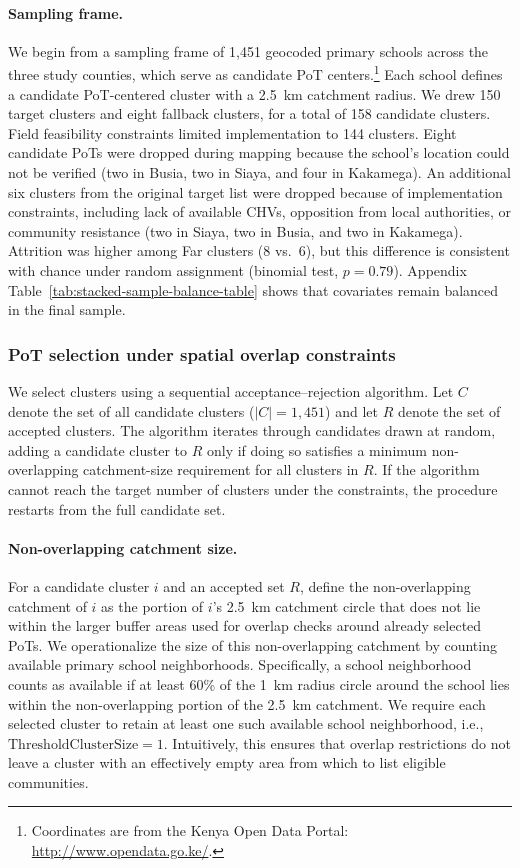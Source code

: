\documentclass[ECM\space ReStud.tex]{subfiles}
\begin{document}
\paragraph{Sampling frame.}
We begin from a sampling frame of 1{,}451 geocoded primary schools across the three study counties, which serve as candidate PoT centers.\footnote{Coordinates are from the Kenya Open Data Portal: \url{http://www.opendata.go.ke/}.} Each school defines a candidate PoT-centered cluster with a 2.5~km catchment radius. We drew 150 target clusters and eight fallback clusters, for a total of 158 candidate clusters. Field feasibility constraints limited implementation to 144 clusters. Eight candidate PoTs were dropped during mapping because the school's location could not be verified (two in Busia, two in Siaya, and four in Kakamega). An additional six clusters from the original target list were dropped because of implementation constraints, including lack of available CHVs, opposition from local authorities, or community resistance (two in Siaya, two in Busia, and two in Kakamega). Attrition was higher among Far clusters (8 vs.\ 6), but this difference is consistent with chance under random assignment (binomial test, \(p=0.79\)). Appendix Table~\ref{tab:stacked-sample-balance-table} shows that covariates remain balanced in the final sample.


\subsubsection*{PoT selection under spatial overlap constraints}

We select clusters using a sequential acceptance--rejection algorithm. Let \(C\) denote the set of all candidate clusters (\(|C|=1{,}451\)) and let \(R\) denote the set of accepted clusters. The algorithm iterates through candidates drawn at random, adding a candidate cluster to \(R\) only if doing so satisfies a minimum non-overlapping catchment-size requirement for all clusters in \(R\). If the algorithm cannot reach the target number of clusters under the constraints, the procedure restarts from the full candidate set.

\paragraph{Non-overlapping catchment size.}
For a candidate cluster \(i\) and an accepted set \(R\), define the non-overlapping catchment of \(i\) as the portion of \(i\)'s 2.5~km catchment circle that does not lie within the larger buffer areas used for overlap checks around already selected PoTs. We operationalize the size of this non-overlapping catchment by counting available primary school neighborhoods. Specifically, a school neighborhood counts as available if at least 60\% of the 1~km radius circle around the school lies within the non-overlapping portion of the 2.5~km catchment. We require each selected cluster to retain at least one such available school neighborhood, i.e., \(\text{ThresholdClusterSize}=1\). Intuitively, this ensures that overlap restrictions do not leave a cluster with an effectively empty area from which to list eligible communities.
\end{document}
